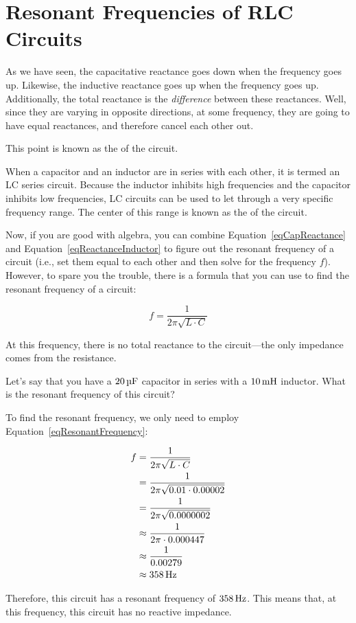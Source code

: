 \section{Resonant Frequencies of RLC Circuits}

As we have seen, the capacitative reactance goes down when the frequency goes up.
Likewise, the inductive reactance goes up when the frequency goes up.
Additionally, the total reactance is the \emph{difference} between these reactances.
Well, since they are varying in opposite directions, at some frequency, they are going to have equal reactances, and therefore cancel each other out.

This point is known as the  of the circuit.

When a capacitor and an inductor are in series with each other, it is termed an LC series circuit.
Because the inductor inhibits high frequencies and the capacitor inhibits low frequencies, LC circuits can be used to let through a very specific frequency range.
The center of this range is known as the  of the circuit.

Now, if you are good with algebra, you can combine Equation~\ref{eqCapReactance} and Equation~\ref{eqReactanceInductor} to figure out the resonant frequency of a circuit (i.e., set them equal to each other and then solve for the frequency $f$).
However, to spare you the trouble, there is a formula that you can use to find the resonant frequency of a circuit:

\begin{equation}
\label{eqResonantFrequency}
f = \frac{1}{2\pi\sqrt{L\cdot C}}
\end{equation}

At this frequency, there is no total reactance to the circuit---the only impedance comes from the resistance.

\begin{exampleprob}
Let's say that you have a $20\,\si{\micro\farad}$ capacitor in series with a $10\mymhy$ inductor.
What is the resonant frequency of this circuit?

To find the resonant frequency, we only need to employ Equation~\ref{eqResonantFrequency}:

\begin{align*}
f &= \frac{1}{2\pi\sqrt{L\cdot C}} \\
  &= \frac{1}{2\pi\sqrt{0.01 \cdot 0.00002}} \\
  &= \frac{1}{2\pi\sqrt{0.0000002}} \\
  &\approx \frac{1}{2\pi\cdot 0.000447} \\
  &\approx \frac{1}{0.00279} \\
  &\approx 358\,\si{\hertz}
\end{align*}

Therefore, this circuit has a resonant frequency of $358\,\si{\hertz}$.  
This means that, at this frequency, this circuit has no reactive impedance.
\end{exampleprob}

